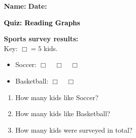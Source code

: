 \documentclass[12pt, letterpaper, fleqn]{article}
\newcommand{\blank}{\underline{\hspace{2.2cm}}}
\begin{document}
\textbf{Name:} \underline{\hspace{5cm}}
\hfill
\textbf{Date:} \underline{\hspace{3cm}}\\

\begin{tcolorbox}[colback=customteal!20]
    \large\textcolor{black}{\textbf{Quiz: Reading Graphs}}
\end{tcolorbox}

\vspace{5mm}
\noindent
\textbf{Sports survey results:}
\\
Key: $\Box = 5$ kids.
\begin{itemize}
  \item Soccer: $\Box \quad \Box \quad \Box$
  \item Basketball: $\Box \quad \Box$
\end{itemize}

\vspace{5mm}
\begin{enumerate}[itemsep=2.5cm, leftmargin=0.6cm]
\item How many kids like Soccer? \blank
\item How many kids like Basketball? \blank
\item How many kids were surveyed in total? \blank
\end{enumerate}
\end{document}
